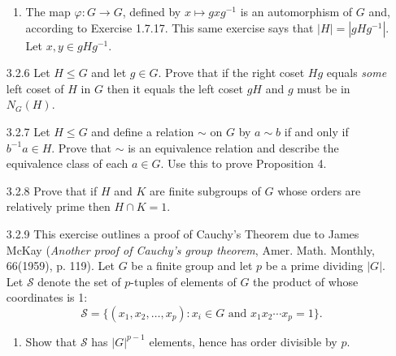 \begin{enumerate}
      \begin{enumerate}
         \item The map $\varphi : G \rightarrow G$, defined by
               $x \mapsto gxg^{-1}$ is an automorphism of $G$ and, according to
               Exercise 1.7.17. This same exercise says that $|H| = |gHg^{-1}|$.
               Let $x, y \in gHg^{-1}$.
      \end{enumerate}
   \item[3.2.6]   Let $H \le G$ and let $g \in G$. Prove that if the right coset
                  $Hg$ equals \textit{some} left coset of $H$ in $G$ then it
                  equals the left coset $gH$ and $g$ must be in $N_G(H)$.
   \item[3.2.7]   Let $H \le G$ and define a relation $\sim$ on $G$ by
                  $a \sim b$ if and only if $b^{-1}a \in H$. Prove that $\sim$
                  is an equivalence relation and describe the equivalence class
                  of each $a \in G$. Use this to prove Proposition 4.
   \item[3.2.8]   Prove that if $H$ and $K$ are finite subgroups of $G$ whose
                  orders are relatively prime then $H \cap K = 1$.
   \item[3.2.9]   This exercise outlines a proof of Cauchy's Theorem due to
                  James McKay (\textit{Another proof of Cauchy's group theorem},
                  Amer. Math. Monthly, 66(1959), p. 119). Let $G$ be a finite
                  group and let $p$ be a prime dividing $|G|$. Let $\mathcal{S}$
                  denote the set of $p$-tuples of elements of $G$ the product of
                  whose coordinates is 1:
                  $$\mathcal{S} = \{(x_1, x_2, \ldots, x_p) : x_i \in G
                    \text{ and } x_1x_2 \cdots x_p = 1\}.$$
                  \begin{enumerate}
                     \item Show that $\mathcal{S}$ has $|G|^{p-1}$ elements,
                           hence has order divisible by $p$.


\end{enumerate}
\end{enumerate}
